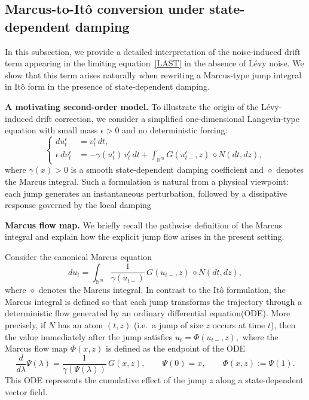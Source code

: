 \documentclass[11pt]{article}
\theoremstyle{plain}
\numberwithin{equation}{section}
\begin{document}
 
 
 
  
  
\subsection{Marcus-to-It\^o conversion under state-dependent damping}
\label{subsec:marcus-drift}

\medskip
In this subsection, we provide a detailed interpretation of the noise-induced drift
term appearing in the limiting equation~\eqref{LAST} in the absence of  L\'evy noise.
We show that this term arises naturally when rewriting a Marcus-type jump integral
in It\^o form in the presence of state-dependent damping.

\medskip
\noindent\textbf{A motivating second-order model.}
To illustrate the origin of the L\'evy-induced drift correction, we consider a simplified
one-dimensional Langevin-type equation with small mass $\epsilon>0$ and no deterministic
forcing:
\begin{equation}\label{eq:toy-second-order}
\left\{
\begin{aligned}
du_t^\epsilon &= v_t^\epsilon\,dt,\\
\epsilon\, dv_t^\epsilon
&= -\gamma(u_t^\epsilon)\,v_t^\epsilon\,dt
   + \int_{\mathbb{R}^m} G(u_{t-}^\epsilon,z)\,\diamond N(dt,dz),
\end{aligned}
\right.
\end{equation}
where $\gamma(x)>0$ is a smooth state-dependent damping coefficient and $\diamond$
denotes the Marcus integral. Such a formulation is natural from a physical viewpoint:
each jump generates an instantaneous perturbation, followed by a dissipative response governed by the local damping




\medskip
\noindent\textbf{Marcus flow map.}
We briefly recall the pathwise definition of the Marcus integral and explain how the
explicit jump flow arises in the present setting.

Consider the canonical Marcus equation
\begin{equation}\label{eq:marcus-recall}
du_t = \int_{\mathbb{R}^m} \frac{1}{\gamma(u_{t-})}\,   G(u_{t-},z)\,\diamond N(dt,dz),
\end{equation}
where $\diamond$ denotes the Marcus integral. In contrast to the It\^o formulation,
the Marcus integral  is defined so that each jump {transforms} the trajectory through a
deterministic flow generated by an ordinary differential equation(ODE).
More precisely, if $N$ has an atom $(t,z)$ (i.e.\ a jump of size $z$ occurs at time $t$),
then the value immediately after the jump satisfies \(u_t=\Phi(u_{t-},z),\)
where the Marcus flow map $\Phi(x,z)$ is defined as the endpoint of the ODE
\begin{equation}\label{eq:marcus-ode}
\frac{d}{d\lambda}\Psi(\lambda)
= \frac{1}{\gamma(\Psi(\lambda))}\,G(x,z),
\qquad
\Psi(0)=x,
\qquad
\Phi(x,z):=\Psi(1).
\end{equation}
This ODE represents the cumulative effect of the jump $z$ along a state-dependent vector field.
\end{document}
